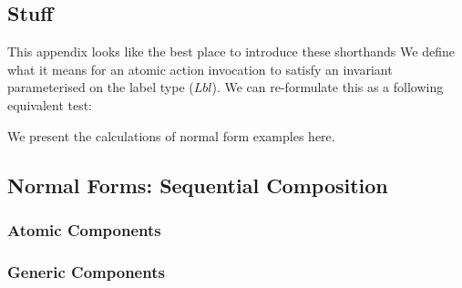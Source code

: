 \subsection{Stuff}
This appendix looks like the best place to introduce these shorthands
We define what it means for an atomic action invocation
to satisfy an invariant parameterised on the label type ($Lbl$).
We can re-formulate this as a following equivalent test:

We present the calculations of normal form examples here.

\subsection{Normal Forms: Sequential Composition}

\subsubsection{Atomic Components}

\subsubsection{Generic Components}

